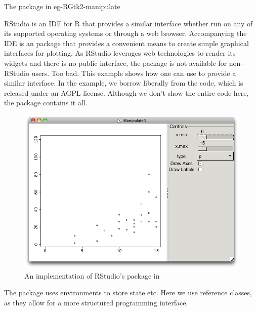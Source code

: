 \begin{example}{The  package in }{eg-RGtk2-manipulate}

RStudio\texttrademark{} is an IDE for R that provides a
similar interface whether run on any of its supported operating
systems or through a web browser. Accompanying the IDE is an
\R{} package  that provides a convenient means to
create simple graphical interfaces for plotting. As RStudio leverages
web technologies to render its widgets and there is no public
interface, the package is not available for non-RStudio users. Too
bad. This example shows how one can use  to provide a
similar interface. In the example, we borrow liberally from the
 code, which is released under an AGPL
license. Although we don't show the entire code here, the
 package contains it all.

\begin{figure}
  \centering
  \includegraphics[width=.8\textwidth]{fig-RGtk2-manipulate.png}
  \caption{An implementation of RStudio's  package in }
  \label{fig:RGtk2-manipulate}
\end{figure}



The  package uses environments to store state
etc. Here we use reference classes, as they allow for a more
structured programming interface. 


\end{example}
